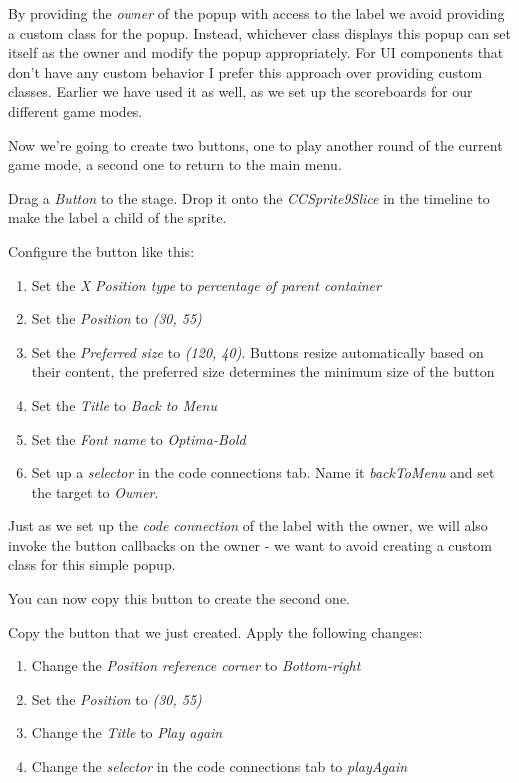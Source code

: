 By providing the \textit{owner} of the popup with access to the label we avoid
providing a custom class for the popup. Instead, whichever class displays this
popup can set itself as the owner and modify the popup appropriately. For UI
components that don't have any custom behavior I prefer this approach over
providing custom classes. Earlier we have used it as well, as we set up the
scoreboards for our different game modes.

Now we're going to create two buttons, one to play another round of the current
game mode, a second one to return to the main menu.

\begin{leftbar}
Drag a \textit{Button} to the stage. Drop it onto the
\textit{CCSprite9Slice} in the timeline to make the label a child of the sprite.

Configure the button like this:
\begin{enumerate}
  \item Set the \textit{X} \textit{Position type} to \textit{percentage of
  parent container}
  \item Set the \textit{Position} to \textit{(30, 55)}
  \item Set the \textit{Preferred size} to \textit{(120, 40)}. Buttons resize
  automatically based on their content, the preferred size determines the
  minimum size of the button
  \item Set the \textit{Title} to \textit{Back to Menu}
  \item Set the \textit{Font name} to \textit{Optima-Bold}
  \item Set up a \textit{selector} in the code connections tab. Name it
  \textit{backToMenu} and set the target to \textit{Owner}.
\end{enumerate}
\end{leftbar}

Just as we set up the \textit{code connection} of the label with the owner, we will also invoke the button callbacks on the owner
 - we want to avoid creating a custom class for this simple popup.

You can now copy this button to create the second one.
\begin{leftbar}
Copy the button that we just created. Apply the following changes:
\begin{enumerate}
  \item Change the \textit{Position reference corner} to \textit{Bottom-right}
  \item Set the \textit{Position} to \textit{(30, 55)}
  \item Change the \textit{Title} to \textit{Play again}
  \item Change the \textit{selector} in the code connections tab to
  \textit{playAgain}
\end{enumerate}
\end{leftbar}

